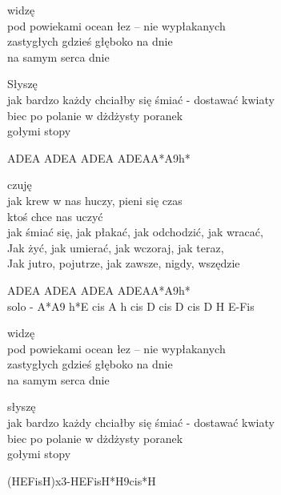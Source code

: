 \begin{text}
    widzę\\
    pod powiekami ocean łez – nie wypłakanych\\
    zastygłych gdzieś głęboko na dnie\\
    na samym serca dnie

    Słyszę\\
    jak bardzo każdy chciałby się śmiać - dostawać kwiaty\\
    biec po polanie w dżdżysty poranek\\
    gołymi stopy

    ADEA ADEA ADEA ADEAA*A9h*

    czuję\\
    jak krew w nas huczy, pieni się czas\\
    ktoś chce nas uczyć\\
    jak śmiać się, jak płakać, jak odchodzić, jak wracać,\\
    Jak żyć, jak umierać, jak wczoraj, jak teraz,\\
    Jak jutro, pojutrze, jak zawsze, nigdy, wszędzie

    ADEA ADEA ADEA ADEAA*A9h*\\
    solo - A*A9 h*E cis A h cis D cis D cis D H E-Fis

    widzę\\
    pod powiekami ocean łez – nie wypłakanych\\
    zastygłych gdzieś głęboko na dnie\\
    na samym serca dnie

    słyszę\\
    jak bardzo każdy chciałby się śmiać - dostawać kwiaty\\
    biec po polanie w dżdżysty poranek\\
    gołymi stopy

    (HEFisH)x3-HEFisH*H9cis*H
\end{text}
